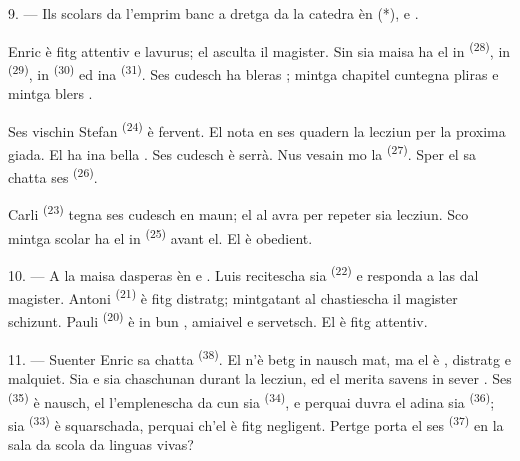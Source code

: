 
\VUsaut{2.4mm}

\VUsaut{3.0mm}

9. --- Ils scolars da l'emprim banc a dretga da la catedra èn  (*),
 e .

Enric è fitg attentiv e lavurus; el asculta il magister. Sin sia maisa ha el in
 \textsuperscript{(28)}, in  \textsuperscript{(29)},
in  \textsuperscript{(30)} ed ina 
\textsuperscript{(31)}. Ses cudesch ha bleras ; mintga chapitel
cuntegna pliras  e mintga  blers .

Ses vischin Stefan \textsuperscript{(24)} è fervent. El nota en ses quadern la
lecziun per la proxima giada. El ha ina bella . Ses cudesch è
serrà. Nus vesain mo la  \textsuperscript{(27)}. Sper el sa chatta
ses  \textsuperscript{(26)}.

Carli \textsuperscript{(23)} tegna ses cudesch en maun; el al avra per repeter sia
lecziun. Sco mintga scolar ha el in  \textsuperscript{(25)}
avant el. El è obedient.

10. --- A la maisa dasperas èn  e . Luis
recitescha sia  \textsuperscript{(22)} e responda a las
 dal magister. Antoni \textsuperscript{(21)} è fitg distratg;
mintgatant al chastiescha il magister schizunt. Pauli \textsuperscript{(20)} è in
bun , amiaivel e servetsch. El è fitg attentiv.

\VUsaut{4.2mm}
\VUsaut{3.2mm}

11. --- Suenter Enric sa chatta  \textsuperscript{(38)}. El n'è betg
in nausch mat, ma el è , distratg e malquiet. Sia
 e sia  chaschunan 
durant la lecziun, ed el merita savens in sever . Ses
 \textsuperscript{(35)} è nausch, el l'emplenescha da
 cun sia  \textsuperscript{(34)}, e perquai
duvra el adina sia  \textsuperscript{(36)}; sia
 \textsuperscript{(33)} è squarschada, perquai ch'el è fitg
negligent. Pertge porta el ses  \textsuperscript{(37)} en la sala
da scola da linguas vivas?

